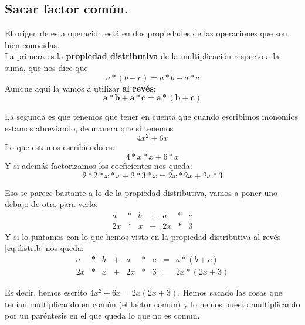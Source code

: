 \documentclass[a4paper,11pt,answers]{exam}
\begin{document}
  \subsection{Sacar factor común.}
  El origen de esta operación está en dos propiedades de las operaciones que son bien conocidas.\\

  La primera es la \textbf{propiedad distributiva} de la multiplicación respecto a la suma, que nos dice que
  \[a*(b+c) = a*b + a*c\]
  Aunque aquí la vamos a utilizar \textbf{al revés}:
  \[\boldsymbol{a*b + a*c = a*(b+c)} \label{eq:distrib} \tag{*}\] 

  La segunda es que tenemos que tener en cuenta que cuando escribimos monomios estamos abreviando, de manera que si tenemos
  \[4x^2 + 6x\]
  Lo que estamos escribiendo es:
  \[4*x*x + 6*x\]
  Y si además factorizamos los coeficientes nos queda:
  \[2*2*x*x + 2*3*x = 2x*2x + 2x*3\]

  Eso se parece bastante a lo de la propiedad distributiva, vamos a poner uno debajo de otro para verlo:
  \[\begin{array}{ccccccc}
      a&*&b&+&a&*&c\\
      2x&*&x&+&2x&*&3
    \end{array}\]
  Y si lo juntamos con lo que hemos visto en la propiedad distributiva al revés \eqref{eq:distrib} nos queda:
  \[\begin{array}{ccccccccc}
      a&*&b&+&a&*&c&=&a*(b+c)\\
      2x&*&x&+&2x&*&3&=&2x*(2x+3)
    \end{array}\]

  Es decir, hemos escrito $4x^2 + 6x = 2x (2x + 3)$. Hemos sacado las cosas que tenían multiplicando en común (el factor común) y lo hemos puesto multiplicando por un paréntesis en el que queda lo que no es común.\\
  
\end{document}
